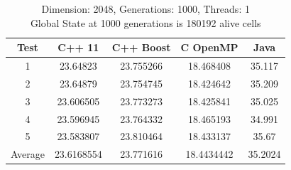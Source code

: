 \documentclass[11pt]{article} %
\begin{document}
\begin{table}[ht]

\caption{Dimension: 2048, Generations: 1000, Threads: 1\\Global State at 1000 generations is 180192 alive cells} %

\centering %

\begin{tabular}{c c c c c} %

\hline\hline %

Test & C++ 11 & C++ Boost & C OpenMP & Java \\ [0.5ex] %


\hline %

1 & 23.64823 & 23.755266 & 18.468408 & 35.117 \\
2 & 23.64879 & 23.754745 & 18.424642 & 35.209 \\
3 & 23.606505 & 23.773273 & 18.425841 & 35.025 \\
4 & 23.596945 & 23.764332 & 18.465193 & 34.991 \\
5 & 23.583807 & 23.810464 & 18.433137 & 35.67 \\
Average & 23.6168554 & 23.771616 & 18.4434442 & 35.2024 \\ [1ex]



\hline %

\end{tabular}
\end{table}
\end{document}
